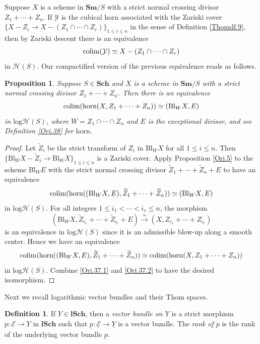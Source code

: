 \documentclass[11pt, a4paper]{amsart}
\newtheorem{prop}[thm]{Proposition}
\theoremstyle{definition}
\newtheorem{df}[thm]{Definition}
\numberwithin{equation}{subsection}
\newcommand{\Sch}{\mathbf{Sch}}
\newcommand{\lSch}{\mathbf{lSch}}
\newcommand{\Sm}{\mathbf{Sm}}
\newcommand{\colimit}{\mathop{\rm colim}}
\newcommand{\Blow}{{\mathrm{Bl}}}
\renewcommand{\ul}{\underline}
\newcommand{\cE}{\mathcal{E}}
\newcommand{\cY}{\mathcal{Y}}
\newcommand{\horn}{\mathrm{horn}}
\newcommand{\infH}{\mathcal{H}}
\newcommand{\inflogH}{\mathrm{log}\mathcal{H}}
\begin{document}
Suppose $X$ is a scheme in $\Sm/S$ with a strict normal crossing divisor $Z_1+\cdots+Z_n$.
If $\cY$ is the cubical horn associated with the Zariski cover $\{X-Z_i\to X-(Z_1\cap \cdots \cap Z_r)\}_{1\leq i\leq n}$ 
in the sense of Definition \ref{Thomdf.9}, then by Zariski descent there is an equivalence
\[
\colimit(\cY)\simeq X-(Z_1\cap \cdots \cap Z_r)
\]
in $\infH(S)$. 
Our compactified version of the previous equivalence reads as follows.

\begin{prop}
\label{Ori.37}
Suppose $S\in \Sch$ and $X$ is a scheme in $\Sm/S$ with a strict normal crossing divisor $Z_1+\cdots+Z_n$.
Then there is an equivalence
\[
\colimit(\horn(X,Z_1+\cdots+Z_n))
\simeq
(\Blow_{W}X,E)
\]
in $\inflogH(S)$, where $W=Z_1\cap \cdots \cap Z_n$ and $E$ is the exceptional divisor,
and see \textup{Definition \ref{Ori.38}} for $\horn$.
\end{prop}
\begin{proof}
Let $\widetilde{Z}_i$ be the strict transform of $Z_i$ in $\Blow_W X$ for all $1\leq i\leq n$.
Then $\{\Blow_{W}X-\widetilde{Z}_i\to \Blow_{W}X\}_{1\leq i\leq n}$ is a Zariski cover.
Apply Proposition \ref{Ori.5} to the scheme $\Blow_{W}E$ with the strict normal crossing divisor $\widetilde{Z}_1+\cdots+\widetilde{Z}_n+E$ to have an equivalence
\begin{equation}
\label{Ori.37.1}
\colimit(\horn((\Blow_W X,E),\widetilde{Z}_1+\cdots+\widetilde{Z}_n))
\simeq
(\Blow_W X,E)
\end{equation}
in $\inflogH(S)$.
For all integers $1\leq i_1<\cdots<i_r\leq n$, the morphism
\[
(\Blow_W X,\widetilde{Z}_{i_1}+\cdots+\widetilde{Z}_{i_r}+E)
\xrightarrow{\simeq}
(X,Z_{i_1}+\cdots+Z_{i_r})
\]
is an equivalence in $\inflogH(S)$ since it is an admissible blow-up along a smooth center.
Hence we have an equivalence
\begin{equation}
\label{Ori.37.2}
\colimit(\horn((\Blow_W X,E),\widetilde{Z}_1+\cdots+\widetilde{Z}_n))
\simeq
\colimit(\horn(X,Z_1+\cdots+Z_n))
\end{equation}
in $\inflogH(S)$.
Combine \eqref{Ori.37.1} and \eqref{Ori.37.2} to have the desired isomorphism.
\end{proof}

Next we recall logarithmic vector bundles and their Thom spaces.

\begin{df}
If $Y\in \lSch$, 
then a \emph{vector bundle on $Y$} is a strict morphism $p\colon \cE\to Y$ in $\lSch$ 
such that $\ul{p}\colon \ul{\cE}\to \ul{Y}$ is a vector bundle.
The \emph{rank of $p$} is the rank of the underlying vector bundle $\ul{p}$.
\end{df}
\end{document}
